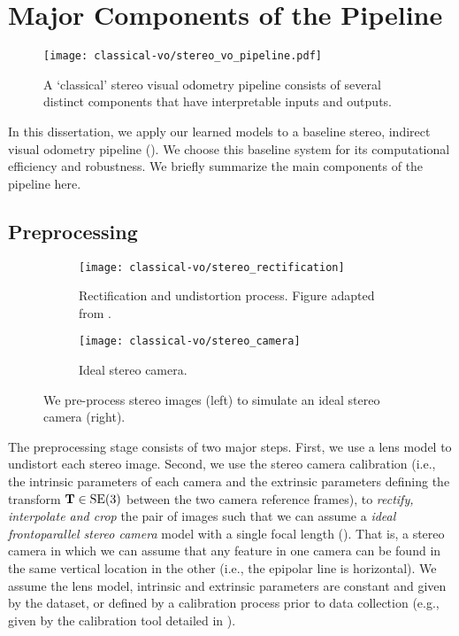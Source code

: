 \section{Major Components of the Pipeline}

\begin{figure}[h!]
\begin{center}
		\texttt{[image: classical-vo/stereo\_vo\_pipeline.pdf]}
		\caption{A `classical' stereo visual odometry pipeline consists of several distinct components that have interpretable inputs and outputs.}
  	\label{fig:vo_stereo_vo_pipeline}
\end{center}
\end{figure}

In this dissertation, we apply our learned models to a baseline stereo, indirect visual odometry pipeline (). We choose this baseline system for its computational efficiency and robustness. We briefly summarize the main components of the pipeline here.



\subsection{Preprocessing}


\begin{figure}[h!]
     \centering
     \begin{subfigure}[b]{0.48\textwidth}
         \centering
         \texttt{[image: classical-vo/stereo\_rectification]}
        \caption{Rectification and undistortion process. Figure adapted from \cite{florez2010}.}
         \label{fig:vo_undistort_recitfy}
	 \end{subfigure}
	 \begin{subfigure}[b]{0.48\textwidth}
         \centering
     		\texttt{[image: classical-vo/stereo\_camera]}
			\caption{Ideal stereo camera.}
			 \label{fig:vo_stereo_camera}
     \end{subfigure}
    \caption{We pre-process stereo images (left) to simulate an ideal stereo camera (right).}
        \label{fig:vo_preprocessing}
\end{figure}
The preprocessing stage consists of two major steps. First, we use a lens model to undistort each stereo image. Second, we use the stereo camera calibration (i.e., the intrinsic parameters of each camera and the extrinsic parameters defining the transform $\boldsymbol{\mathbf{T}} \in \mathrm{SE}(3)$ between the two camera reference frames), to \textit{rectify, interpolate and crop} the pair of images such that we can assume a \textit{ideal frontoparallel stereo camera} model with a single focal length (). That is, a stereo camera in which we can assume that any feature in one camera can be found in the same vertical location in the other (i.e., the epipolar line is horizontal). We assume the lens model, intrinsic and extrinsic parameters are constant and given by the dataset, or defined by a calibration process prior to data collection (e.g., given by the calibration tool detailed in \cite{Furgale2013-sl}).

